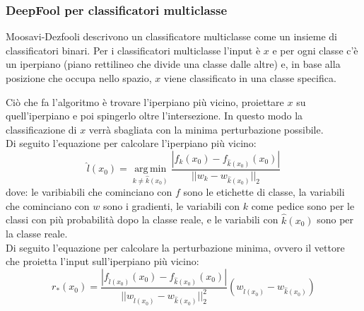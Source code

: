         \subsubsection*{DeepFool per classificatori multiclasse}
        Moosavi-Dezfooli \cite{moosavi2015deepfool} descrivono un classificatore multiclasse come un insieme di classificatori binari.
        Per i classificatori multiclasse l'input è $x$ e per ogni classe c'è un iperpiano (piano rettilineo che divide una classe dalle altre) e, in base alla posizione che occupa nello spazio, $x$ viene classificato in una classe specifica.
        
        Ciò che fa l'algoritmo è trovare l'iperpiano più vicino, proiettare $x$ su quell'iperpiano e poi spingerlo oltre l'intersezione. In questo modo la classificazione di $x$ verrà sbagliata con la minima perturbazione possibile.\\
        
        Di seguito l'equazione per calcolare l'iperpiano più vicino:
            \begin{equation}
            \label{closest hyperplane}
                \hat{l}(x_0) = 
                \operatorname*{arg\,min}_{k \neq \hat{k}(x_0)} \frac{|f_k(x_0)-f_{\hat{k}(x_0)}(x_0)|}{||w_k-w_{\hat{k}(x_0)}||_2}
            \end{equation}
        dove: le varibiabili che cominciano con $f$ sono le etichette di classe, la variabili che cominciano con $w$ sono i gradienti, le variabili con $k$ come pedice sono per le classi con più probabilità dopo la classe reale, e le variabili con $\hat{k}(x_0)$ sono per la classe reale.\\
        
        Di seguito l'equazione per calcolare la perturbazione minima, ovvero il vettore che proietta l'input sull'iperpiano più vicino:
            \begin{equation}
            \label{minimal perturbation}
                r_*(x_0)=\frac{|f_{\hat{l}(x_0)}(x_0)-f_{\hat{k}(x_0)}(x_0)|}{||w_{\hat{l}(x_0)}-w_{\hat{k}(x_0)}||^2_2}(w_{\hat{l}(x_0)}-w_{\hat{k}(x_0)})
            \end{equation}\\
        
